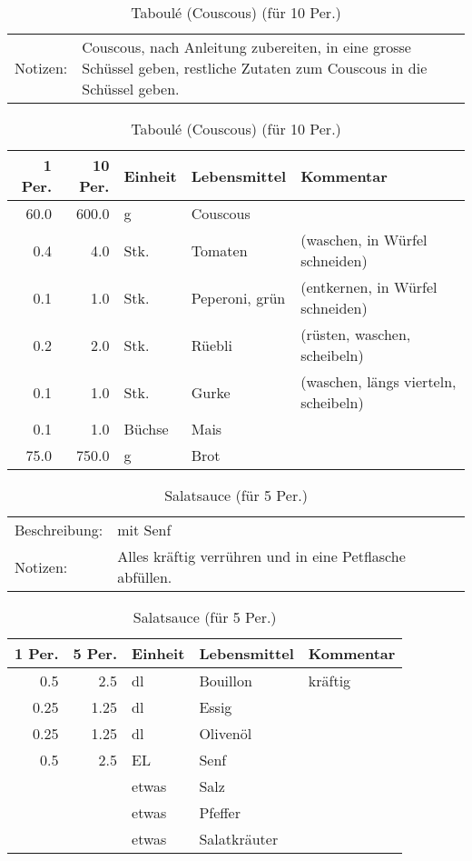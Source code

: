 \documentclass[11pt,a4paper]{article}%
\begin{document}
\begin{table}[h]%
\caption{Taboulé (Couscous) (für 10 Per.)}%
\begin{tabularx}{\textwidth}{l X}%
Notizen:&Couscous, nach Anleitung zubereiten, in eine grosse Schüssel geben, restliche Zutaten zum Couscous in die Schüssel geben. \\%
\end{tabularx}%
\par%
\begin{tabularx}{\textwidth}{| r | r | l | l | X |}%
\hline%
\tiny{1 Per.}&\tiny{10 Per.}&\tiny{Einheit}&\tiny{Lebensmittel}&\tiny{Kommentar}\\%
\hline%
60.0&600.0&g&Couscous&\\%
\hline%
0.4&4.0&Stk.&Tomaten&(waschen, in Würfel schneiden)\\%
\hline%
0.1&1.0&Stk.&Peperoni, grün& (entkernen, in Würfel schneiden)\\%
\hline%
0.2&2.0&Stk.&Rüebli&(rüsten, waschen, scheibeln)\\%
\hline%
0.1&1.0&Stk.&Gurke&(waschen, längs vierteln, scheibeln)\\%
\hline%
0.1&1.0&Büchse&Mais&\\%
\hline%
75.0&750.0&g&Brot&\\%
\hline%
\end{tabularx}%
\end{table}

%
\vspace{0.75cm}%
\renewcommand{\arraystretch}{1.25}%


\begin{table}[h]%
\caption{Salatsauce (für 5 Per.)}%
\begin{tabularx}{\textwidth}{l X}%
Beschreibung: &mit Senf\\%
Notizen:&Alles kräftig verrühren und in eine Petflasche abfüllen.\\%
\end{tabularx}%
\par%
\begin{tabularx}{\textwidth}{| r | r | l | l | X |}%
\hline%
\tiny{1 Per.}&\tiny{5 Per.}&\tiny{Einheit}&\tiny{Lebensmittel}&\tiny{Kommentar}\\%
\hline%
0.5&2.5&dl&Bouillon&kräftig\\%
\hline%
0.25&1.25&dl&Essig&\\%
\hline%
0.25&1.25&dl&Olivenöl&\\%
\hline%
0.5&2.5&EL&Senf&\\%
\hline%
&&etwas&Salz&\\%
\hline%
&&etwas&Pfeffer&\\%
\hline%
&&etwas&Salatkräuter&\\%
\hline%
\end{tabularx}%
\end{table}
\end{document}
